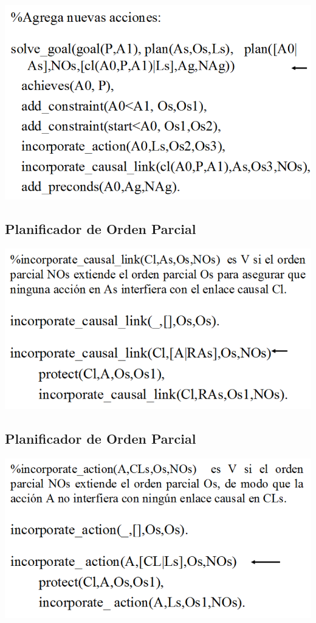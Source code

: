 \documentclass[11pt]{article}
\begin{document}
\begin{center}
\includegraphics[width=.9\linewidth]{imagenes/Pop3.png}
\end{center}

\subsection*{Planificador de Orden Parcial}
\label{sec:orga6b2899}

\begin{center}
\includegraphics[width=.9\linewidth]{imagenes/Pop4.png}
\end{center}

\subsection*{Planificador de Orden Parcial}
\label{sec:org53cdc04}

\begin{center}
\includegraphics[width=.9\linewidth]{imagenes/Pop5.png}
\end{center}
\end{document}
